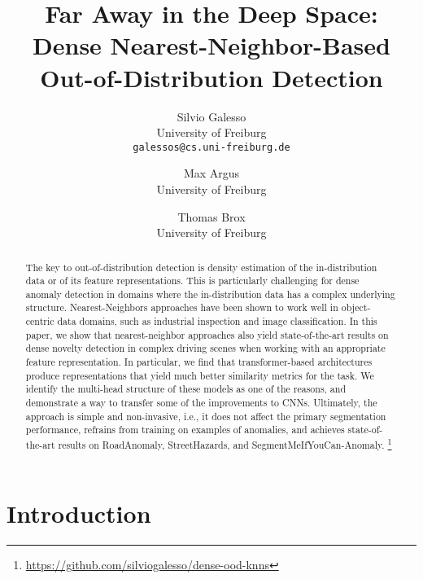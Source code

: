 \documentclass[10pt,twocolumn,letterpaper]{article}
\newcommand\blfootnote[1]{\begingroup
  \renewcommand\thefootnote{}\footnote{#1}\addtocounter{footnote}{-1}\endgroup
}
\begin{document}
\title{Far Away in the Deep Space:\\Dense Nearest-Neighbor-Based Out-of-Distribution Detection}


\author{Silvio Galesso\\
University of Freiburg\\
{\tt\small galessos@cs.uni-freiburg.de}
\and
Max Argus\\
University of Freiburg\\
{}
\and
Thomas Brox\\
University of Freiburg\\
{}
}
\maketitle

\begin{abstract}
The key to out-of-distribution detection is density estimation of the in-distribution data or of its feature representations.
This is particularly challenging for dense anomaly detection in domains where the in-distribution data has a complex underlying structure. 
Nearest-Neighbors approaches have been shown to work well in object-centric data domains, such as industrial inspection and image classification.
In this paper, we show that nearest-neighbor approaches also yield state-of-the-art results on dense novelty detection in complex driving scenes when working with an appropriate feature representation. 
In particular, we find that transformer-based architectures produce representations that yield much better similarity metrics for the task. We identify the multi-head structure of these models as one of the reasons, and demonstrate a way to transfer some of the improvements to CNNs.
Ultimately, the approach is simple and non-invasive, i.e., it does not affect the primary segmentation performance, refrains from training on examples of anomalies, and achieves state-of-the-art results on RoadAnomaly, StreetHazards, and SegmentMeIfYouCan-Anomaly.\blfootnote{\href{https://github.com/silviogalesso/dense-ood-knns}{{https://github.com/silviogalesso/dense-ood-knns}}}

\end{abstract}







\section{Introduction}
\end{document}
